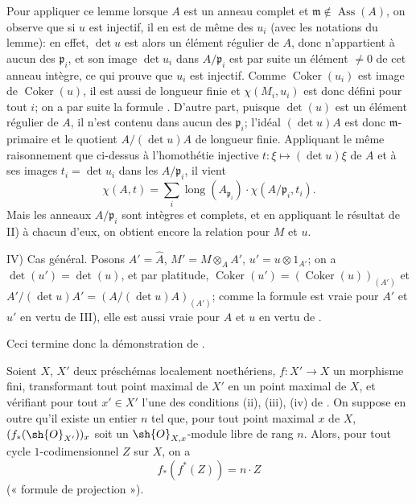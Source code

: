 Pour appliquer ce lemme lorsque $A$ est un anneau complet et $\mathfrak{m}\notin\operatorname{Ass}(A)$, on observe que si $u$ est injectif, il en est de même des $u_i$ (avec les notations du lemme):
en effet, $\det u$ est alors un élément régulier de $A$, donc n'appartient à aucun des $\mathfrak{p}_i$, et son image $\det u_i$ dans $A/\mathfrak{p}_i$ est par suite un élément $\neq0$ de cet anneau intègre, ce qui prouve que $u_i$ est injectif.
Comme $\operatorname{Coker}(u_i)$ est image de $\operatorname{Coker}(u)$, il est aussi de longueur finie et $\chi(M_i,u_i)$ est donc défini pour tout $i$;
on a par suite la formule .
D'autre part, puisque $\det(u)$ est un élément régulier de $A$, il n'est contenu dans aucun des $\mathfrak{p}_i$;
l'idéal $(\det u)A$ est donc $\mathfrak{m}$-primaire et le quotient $A/(\det u)A$ de longueur finie.
Appliquant le même raisonnement que ci-dessus à l'homothétie injective $t:\xi\mapsto(\det u)\xi$ de $A$ et à ses images $t_i=\det u_i$ dans les $A/\mathfrak{p}_i$, il vient
\[
  \chi(A,t)=\sum_i\operatorname{long}(A_{\mathfrak{p}_i})\cdot\chi(A/\mathfrak{p}_i,t_i).
\]
Mais les anneaux $A/\mathfrak{p}_i$ sont intègres et complets, et en appliquant le résultat de II) à chacun d'eux, on obtient encore la relation  pour $M$ et $u$.

IV) Cas général.
Posons $A'=\widehat{A}$, $M'=M\otimes_AA'$, $u'=u\otimes1_{A'}$;
on a $\det(u')=\det(u)$, et par platitude, $\operatorname{Coker}(u')=(\operatorname{Coker}(u))_{(A')}$ et $A'/(\det u)A'=(A/(\det u)A)_{(A')}$;
comme la formule  est vraie pour $A'$ et $u'$ en vertu de III), elle est aussi vraie pour $A$ et $u$ en vertu de .

Ceci termine donc la démonstration de .

\begin{proposition}[21.10.18]
\label{IV.21.10.18}
Soient $X$, $X'$ deux préschémas localement noethériens, $f:X'\to X$ un morphisme fini, transformant tout point maximal de $X'$ en un point maximal de $X$, et vérifiant pour tout $x'\in X'$ l'une des conditions (ii), (iii), (iv) de .
On suppose en outre qu'il existe un entier $n$ tel que, pour tout point maximal $x$ de $X$, $(f_*(\sh{O}_{X'}))_x$ soit un $\sh{O}_{X,x}$-module libre de rang $n$.
Alors, pour tout cycle $1$-codimensionnel $Z$ sur $X$, on a
\[
\label{IV.21.10.18.1}
  f_*(f^*(Z))=n\cdot Z
  \tag{21.10.18.1}
\]
(« formule de projection »).
\end{proposition}

